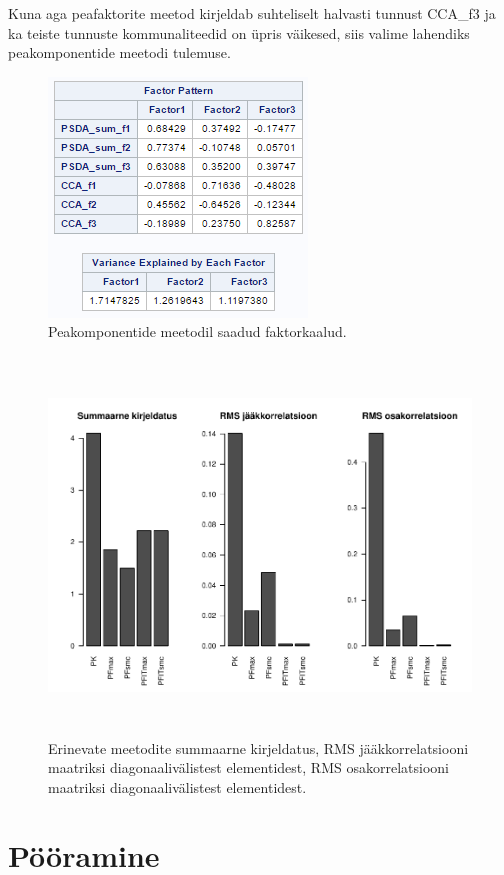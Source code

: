 \documentclass[a4paper,12pt]{report}
\begin{document}
Kuna aga peafaktorite meetod kirjeldab suhteliselt halvasti tunnust CCA\_f3 ja ka teiste tunnuste kommunaliteedid on üpris väikesed, siis valime lahendiks peakomponentide meetodi tulemuse.

\begin{figure}[h!]
	\centering\includegraphics{kaalud.png}
	\caption{Peakomponentide meetodil saadud faktorkaalud.}
\end{figure}

\begin{figure}[h!]
	\centering
	\includegraphics[height=10cm]{kaalud3.pdf}
	\caption{Erinevate meetodite summaarne kirjeldatus, RMS jääkkorrelatsiooni maatriksi diagonaalivälistest elementidest, RMS osakorrelatsiooni maatriksi diagonaalivälistest elementidest.}\label{head}
\end{figure}

\section{Pööramine}
\end{document}
